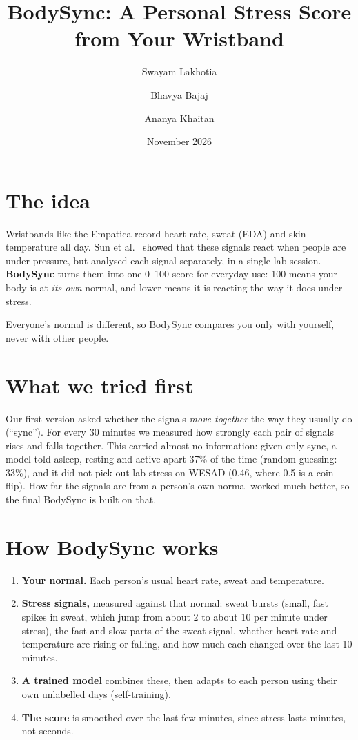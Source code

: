 \documentclass{article}
\title{BodySync: A Personal Stress Score from Your Wristband}
\author{Swayam Lakhotia \and Bhavya Bajaj \and Ananya Khaitan}
\date{November 2026}
\begin{document}
\maketitle

\section{The idea}

Wristbands like the Empatica record heart rate, sweat (EDA) and skin temperature all day. Sun et al.~\cite{sun2026trust} showed that these signals react when people are under pressure, but analysed each signal separately, in a single lab session. \textbf{BodySync} turns them into one 0--100 score for everyday use: 100 means your body is at \emph{its own} normal, and lower means it is reacting the way it does under stress.

Everyone's normal is different, so BodySync compares you only with yourself, never with other people.

\section{What we tried first}

Our first version asked whether the signals \emph{move together} the way they usually do (``sync''). For every 30 minutes we measured how strongly each pair of signals rises and falls together. This carried almost no information: given only sync, a model told asleep, resting and active apart 37\% of the time (random guessing: 33\%), and it did not pick out lab stress on WESAD (0.46, where 0.5 is a coin flip). How far the signals are from a person's own normal worked much better, so the final BodySync is built on that.

\section{How BodySync works}

\begin{enumerate}
\item \textbf{Your normal.} Each person's usual heart rate, sweat and temperature.
\item \textbf{Stress signals,} measured against that normal: sweat bursts (small, fast spikes in sweat, which jump from about 2 to about 10 per minute under stress), the fast and slow parts of the sweat signal, whether heart rate and temperature are rising or falling, and how much each changed over the last 10 minutes.
\item \textbf{A trained model} combines these, then adapts to each person using their own unlabelled days (self-training).
\item \textbf{The score} is smoothed over the last few minutes, since stress lasts minutes, not seconds.
\end{enumerate}
\end{document}
